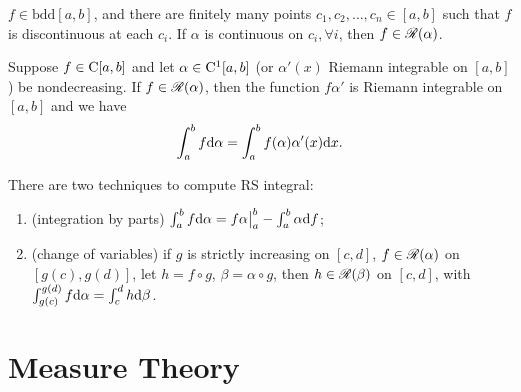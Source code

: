 \documentclass[10pt,a4paper]{article}
\begin{document}
\begin{thmbox}
	\begin{theorem}\label{thm:RSint-finitediscts}
		\rm $f\in\mathrm{bdd}[a,b]$, and there are finitely many points $c_1,c_2,\ldots,c_n\in[a,b]$ such that $f$ is discontinuous at each $c_i$. If $\alpha$ is continuous on $c_i,\forall i$, then $f\in\mathscr{R}(\alpha)$.   
	\end{theorem}

	\begin{theorem}\label{thm:RSint-cts}
		\rm Suppose $f\in \mathrm{C}[a,b]$ and let $\alpha\in\mathrm{C}^1[a,b]$ (or $\alpha'(x)$ Riemann integrable on $[a,b]$) be nondecreasing. If $f\in\mathscr{R}(\alpha)$, then the function $f\alpha'$ is Riemann integrable on $[a,b]$ and we have   
	{\setlength\abovedisplayskip{0.15cm}
	\setlength\belowdisplayskip{0.15cm}
	\begin{equation*}
		\int_{a}^{b} f\mathrm{d} \alpha = \int_{a}^{b}f(\alpha) \alpha'(x)\mathrm{d} x.
	\end{equation*}}
	\end{theorem}
\end{thmbox}

There are two techniques to compute RS integral:
\begin{enumerate}
	\item (integration by parts) $\int_{a}^{b}f\mathrm{d} \alpha=f\alpha \big|_{a}^b - \int_{a}^{b}\alpha\mathrm{d} f$;
	\item (change of variables) if $g$ is strictly increasing on $[c,d]$, $f\in\mathscr{R}(\alpha)$ on $[g(c),g(d)]$, let $h=f\circ g$, $\beta=\alpha\circ g$, then $h\in\mathscr{R}(\beta)$ on $[c,d]$, with $\int_{g(c)}^{g(d)}f\mathrm{d} \alpha=\int_{c}^{d}h\mathrm{d} \beta$.          
\end{enumerate}



\section{Measure Theory}\label{sec:measure}
\end{document}
